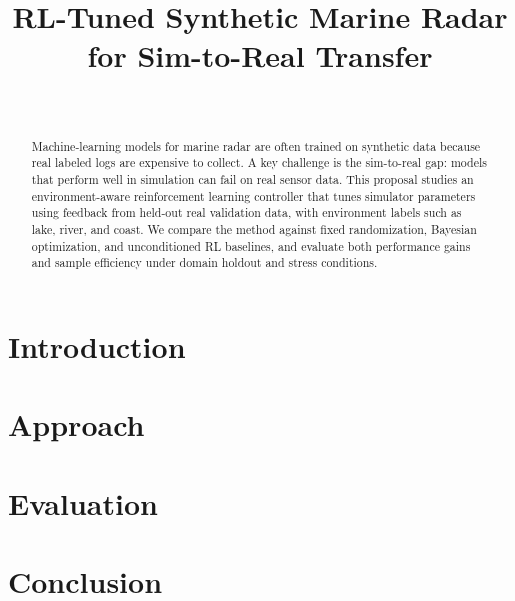 \documentclass[conference]{IEEEtran}
\title{RL-Tuned Synthetic Marine Radar for Sim-to-Real Transfer}
\author{\IEEEauthorblockN{IMSEL Research Group} \\
\IEEEauthorblockA{CSCE 775: Deep Reinforcement Learning}}
\begin{document}
\maketitle

\begin{abstract}
Machine-learning models for marine radar are often trained on synthetic data because real labeled logs are expensive to collect. A key challenge is the sim-to-real gap: models that perform well in simulation can fail on real sensor data. This proposal studies an environment-aware reinforcement learning controller that tunes simulator parameters using feedback from held-out real validation data, with environment labels such as lake, river, and coast. We compare the method against fixed randomization, Bayesian optimization, and unconditioned RL baselines, and evaluate both performance gains and sample efficiency under domain holdout and stress conditions.
\end{abstract}


\section{Introduction}


\section{Approach}



\section{Evaluation}


\section{Conclusion}




\end{document}
